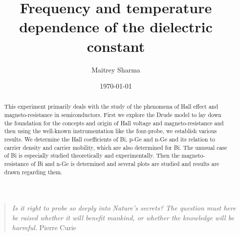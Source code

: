 \documentclass[%
 aip,
 amsmath,amssymb,
 reprint, floatfix%
]{revtex4-1}
\begin{document}

\title[Frequency and temperature dependence of the dielectric constant]{Frequency and temperature dependence of the dielectric constant}
\author{Maitrey Sharma}

\date{\today}%

\begin{abstract}
This experiment primarily deals with the study of the phenomena of Hall effect and magneto-resistance in semiconductors. First we explore the Drude model to lay down the foundation for the concepts and origin of Hall voltage and magneto-resistance and then using the well-known instrumentation like the four-probe, we establish various results. We determine the Hall coefficients of Bi, p-Ge and n-Ge and its relation to carrier density and carrier mobility, which are also determined for Bi. The unusual case of Bi is especially studied theoretically and experimentally. Then the magneto-resistance of Bi and n-Ge is determined and several plots are studied and results are drawn regarding them. 
\end{abstract}

\maketitle 


\begin{quotation}
\textit{Is it right to probe so deeply into Nature's secrets? The question must here be raised whether it will benefit mankind, or whether the knowledge will be harmful.}
\newline
\hspace*{0pt}\hfill Pierre Curie
\end{quotation}
\end{document}
